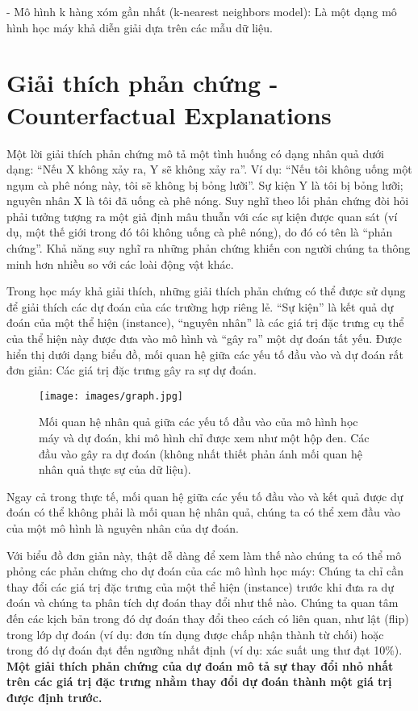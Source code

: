 - Mô hình k hàng xóm gần nhất (k-nearest neighbors model): Là một dạng mô hình học máy khả diễn giải dựa trên các mẫu dữ liệu.

\section{Giải thích phản chứng - Counterfactual Explanations}
Một lời giải thích phản chứng mô tả một tình huống có dạng nhân quả dưới dạng: ``Nếu X không xảy ra, Y sẽ không xảy ra''. Ví dụ: ``Nếu tôi không uống một ngụm cà phê nóng này, tôi sẽ không bị bỏng lưỡi''. Sự kiện Y là tôi bị bỏng lưỡi; nguyên nhân X là tôi đã uống cà phê nóng. Suy nghĩ theo lối phản chứng đòi hỏi phải tưởng tượng ra một giả định mâu thuẫn với các sự kiện được quan sát (ví dụ, một thế giới trong đó tôi không uống cà phê nóng), do đó có tên là ``phản chứng''. Khả năng suy nghĩ ra những phản chứng khiến con người chúng ta thông minh hơn nhiều so với các loài động vật khác.

Trong học máy khả giải thích, những giải thích phản chứng có thể được sử dụng để giải thích các dự đoán của các trường hợp riêng lẻ. ``Sự kiện'' là kết quả dự đoán của một thể hiện  (instance), ``nguyên nhân'' là các giá trị đặc trưng cụ thể của thể hiện này được đưa vào mô hình và ``gây ra'' một dự đoán tất yếu. Được hiển thị dưới dạng biểu đồ, mối quan hệ giữa các yếu tố đầu vào và dự đoán rất đơn giản: Các giá trị đặc trưng gây ra sự dự đoán.

\begin{figure*}[h!]
	\centering
	\texttt{[image: images/graph.jpg]}
    \label{fig:6.1}
    \caption{Mối quan hệ nhân quả giữa các yếu tố đầu vào của mô hình học máy và dự đoán, khi mô hình chỉ được xem như một hộp đen. Các đầu vào gây ra dự đoán (không nhất thiết phản ánh mối quan hệ nhân quả thực sự của dữ liệu).}
\end{figure*}

Ngay cả trong thực tế, mối quan hệ giữa các yếu tố đầu vào và kết quả được dự đoán có thể không phải là mối quan hệ nhân quả, chúng ta có thể xem đầu vào của một mô hình là nguyên nhân của dự đoán.

Với biểu đồ đơn giản này, thật dễ dàng để xem làm thế nào chúng ta có thể mô phỏng các phản chứng cho dự đoán của các mô hình học máy: Chúng ta chỉ cần thay đổi các giá trị đặc trưng của một thể hiện (instance) trước khi đưa ra dự đoán và chúng ta phân tích dự đoán thay đổi như thế nào. Chúng ta quan tâm đến các kịch bản trong đó dự đoán thay đổi theo cách có liên quan, như lật (flip) trong lớp dự đoán (ví dụ: đơn tín dụng được chấp nhận thành từ chối) hoặc trong đó dự đoán đạt đến ngưỡng nhất định (ví dụ: xác suất ung thư đạt 10\%). \textbf{Một giải thích phản chứng của dự đoán mô tả sự thay đổi nhỏ nhất trên các giá trị đặc trưng nhằm thay đổi dự đoán thành một giá trị được định trước.}


